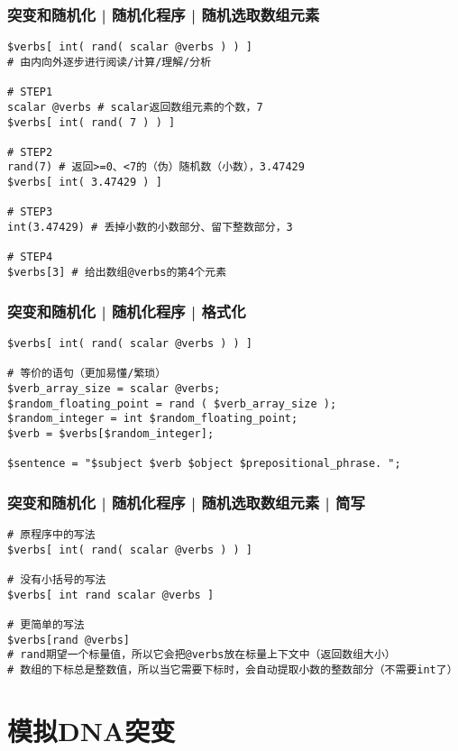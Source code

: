 \begin{frame}[fragile]
  \frametitle{突变和随机化 | 随机化程序 | \alert{随机选取数组元素}}
  \vspace{-1.5em}
\begin{lstlisting}[basicstyle=\small\tt]
$verbs[ int( rand( scalar @verbs ) ) ] 
# 由内向外逐步进行阅读/计算/理解/分析

# STEP1
scalar @verbs # scalar返回数组元素的个数，7
$verbs[ int( rand( 7 ) ) ]

# STEP2
rand(7) # 返回>=0、<7的（伪）随机数（小数），3.47429
$verbs[ int( 3.47429 ) ]

# STEP3
int(3.47429) # 丢掉小数的小数部分、留下整数部分，3

# STEP4
$verbs[3] # 给出数组@verbs的第4个元素
\end{lstlisting}
\end{frame}

\begin{frame}[fragile]
  \frametitle{突变和随机化 | 随机化程序 | 格式化}
  \vspace{-1.5em}
\begin{lstlisting}
$verbs[ int( rand( scalar @verbs ) ) ] 

# 等价的语句（更加易懂/繁琐）
$verb_array_size = scalar @verbs;
$random_floating_point = rand ( $verb_array_size );
$random_integer = int $random_floating_point;
$verb = $verbs[$random_integer];

$sentence = "$subject $verb $object $prepositional_phrase. ";
\end{lstlisting}
\end{frame}

\begin{frame}[fragile]
  \frametitle{突变和随机化 | 随机化程序 | 随机选取数组元素 | \alert{简写}}
  \vspace{-1.5em}
\begin{lstlisting}
# 原程序中的写法
$verbs[ int( rand( scalar @verbs ) ) ] 

# 没有小括号的写法
$verbs[ int rand scalar @verbs ] 

# 更简单的写法
$verbs[rand @verbs]
# rand期望一个标量值，所以它会把@verbs放在标量上下文中（返回数组大小）
# 数组的下标总是整数值，所以当它需要下标时，会自动提取小数的整数部分（不需要int了）
\end{lstlisting}
\end{frame}

\section{模拟DNA突变}
